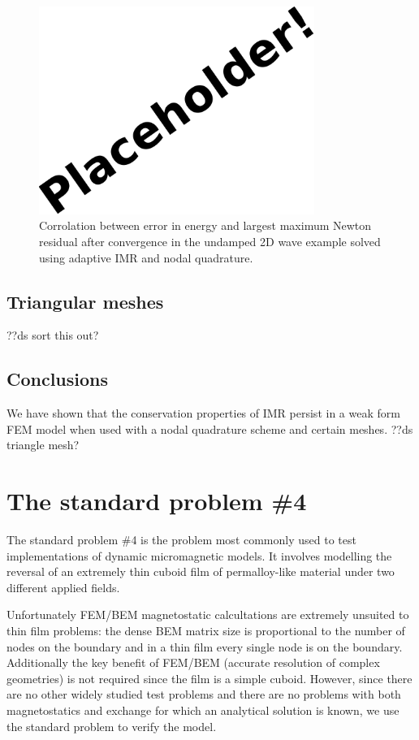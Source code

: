 \begin{figure}
  \centering
  \includegraphics[width=0.8\textwidth] {images/placeholder}
  \caption{Corrolation between error in energy and largest maximum Newton residual after convergence in the undamped 2D wave example solved using adaptive IMR and nodal quadrature.}
  \label{fig:energy-error-2d-nodal-newton-tests}
\end{figure}


\subsection{Triangular meshes}

??ds sort this out?


\subsection{Conclusions}

We have shown that the conservation properties of IMR persist in a weak form FEM model when used with a nodal quadrature scheme and certain meshes.
??ds triangle mesh?




\section{The \mumag standard problem \#4}

The \mumag standard problem \#4 is the problem most commonly used to test implementations of dynamic micromagnetic models.
It involves modelling the reversal of an extremely thin cuboid film of permalloy-like material under two different applied fields.

Unfortunately FEM/BEM magnetostatic calcultations are extremely unsuited to thin film problems: the dense BEM matrix size is proportional to the number of nodes on the boundary and in a thin film every single node is on the boundary.
Additionally the key benefit of FEM/BEM (accurate resolution of complex geometries) is not required since the film is a simple cuboid.
However, since there are no other widely studied test problems and there are no problems with both magnetostatics and exchange for which an analytical solution is known, we use the standard problem to verify the model.


